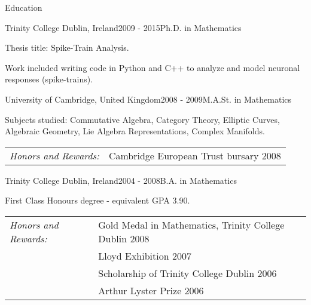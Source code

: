 \documentclass{resume} %
\begin{document}

\begin{rSection}{Education}
\begin{rSubsection}{Trinity College Dublin, Ireland}{2009 - 2015}{Ph.D. in Mathematics}{}
\item Thesis title:  Spike-Train Analysis.  
\item Work included writing code in Python and C++ to analyze and model neuronal responses (spike-trains).
\end{rSubsection}

\begin{rSubsection}{University of Cambridge, United Kingdom}{2008 - 2009}{M.A.St. in Mathematics}{}
\item Subjects studied: Commutative Algebra, Category Theory, Elliptic Curves, Algebraic Geometry, Lie Algebra Representations, Complex Manifolds.

\begin{tabular}{ll}
\emph{Honors and Rewards:} & Cambridge European Trust bursary 2008
\end{tabular}
\end{rSubsection}

\begin{rSubsection}{Trinity College Dublin, Ireland}{2004 - 2008}{B.A. in Mathematics}{}
\item First Class Honours degree - equivalent GPA 3.90.

\begin{tabular}{ll}
\emph{Honors and Rewards:}  & Gold Medal in Mathematics, Trinity College Dublin 2008\\
& Lloyd Exhibition 2007\\
& Scholarship of Trinity College Dublin 2006\\
& Arthur Lyster Prize 2006
\end{tabular}


\end{rSubsection}
\end{rSection}
\end{document}
